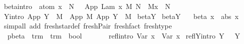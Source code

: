 \begin{isabellebody}
{\isacharbar}\ beta{\isacharbrackleft}intro{\isacharbrackright}{\isacharcolon}\ {\isachardoublequoteopen}{\isasymlbrakk}\ atom\ x\ {\isasymsharp}\ N\ {\isasymrbrakk}\ {\isasymLongrightarrow}\ App\ {\isacharparenleft}Lam\ {\isacharbrackleft}x{\isacharbrackright}{\isachardot}\ M{\isacharparenright}\ N\ {\isasymRightarrow}\ M{\isacharbrackleft}x\ {\isacharcolon}{\isacharcolon}{\isacharequal}\ N{\isacharbrackright}{\isachardoublequoteclose}\isanewline
\isanewline
{\isacharbar}\ Y{\isacharbrackleft}intro{\isacharbrackright}{\isacharcolon}\ {\isachardoublequoteopen}App\ {\isacharparenleft}Y\ {\isasymsigma}{\isacharparenright}\ M\ {\isasymRightarrow}\ App\ M\ {\isacharparenleft}App\ {\isacharparenleft}Y\ {\isasymsigma}{\isacharparenright}\ M{\isacharparenright}{\isachardoublequoteclose}\isanewline
\isanewline
{}\isamarkupfalse%
\ beta{\isacharunderscore}Y\isanewline
{}\isamarkupfalse%
\ beta{\isacharunderscore}Y\isanewline
\ \ \ beta{\isacharcolon}\ {\isachardoublequoteopen}x{\isachardoublequoteclose}\ {\isacharbar}\ abs{\isacharcolon}\ {\isachardoublequoteopen}x{\isachardoublequoteclose}\isanewline
%
\isadelimproof
%
\endisadelimproof
%
\isatagproof
{}\isamarkupfalse%
\ {\isacharparenleft}simp{\isacharunderscore}all\ add{\isacharcolon}\ fresh{\isacharunderscore}star{\isacharunderscore}def\ fresh{\isacharunderscore}Pair\ fresh{\isacharunderscore}fact\ fresh{\isacharunderscore}type{\isacharparenright}%
\endisatagproof
{\isafoldproof}%
%
\isadelimproof
%
\endisadelimproof
%
\isamarkuptrue%
\isamarkupfalse%
\ \isanewline
\ \ pbeta\ {\isacharcolon}{\isacharcolon}\ {\isachardoublequoteopen}trm\ {\isasymRightarrow}\ trm\ {\isasymRightarrow}\ bool{\isachardoublequoteclose}\ {\isacharparenleft}{\isachardoublequoteopen}{\isacharunderscore}\ {\isasymggreater}\ {\isacharunderscore}{\isachardoublequoteclose}\ {\isacharbrackleft}{}{}{\isacharcomma}{}{}{\isacharbrackright}\ {}{}{\isacharparenright}\isanewline
{}\isanewline
\ \ refl{\isacharbrackleft}intro{\isacharbrackright}{\isacharcolon}\ {\isachardoublequoteopen}{\isacharparenleft}Var\ x{\isacharparenright}\ {\isasymggreater}\ {\isacharparenleft}Var\ x{\isacharparenright}{\isachardoublequoteclose}\isanewline
{\isacharbar}\ reflY{\isacharbrackleft}intro{\isacharbrackright}{\isacharcolon}\ {\isachardoublequoteopen}Y\ {\isasymsigma}\ {\isasymggreater}\ Y\ {\isasymsigma}{\isachardoublequoteclose}\isanewline

\end{isabellebody}
